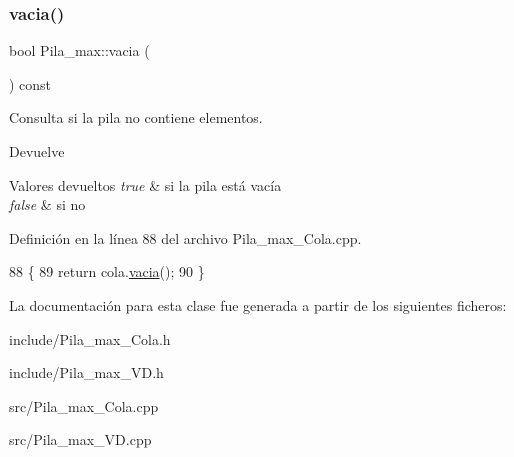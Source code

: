 \subsubsection{\texorpdfstring{vacia()}{vacia()}\hspace{0.1cm}{\footnotesize\ttfamily [2/2]}}
{\footnotesize\ttfamily bool Pila\+\_\+max\+::vacia (\begin{DoxyParamCaption}{ }\end{DoxyParamCaption}) const}



Consulta si la pila no contiene elementos. 

\begin{DoxyReturn}{Devuelve}

\end{DoxyReturn}

\begin{DoxyRetVals}{Valores devueltos}
{\em true} & si la pila está vacía \\
\hline
{\em false} & si no \\
\hline
\end{DoxyRetVals}


Definición en la línea 88 del archivo Pila\+\_\+max\+\_\+\+Cola.\+cpp.


\begin{DoxyCode}
88                           \{
89     \textcolor{keywordflow}{return} cola.\hyperlink{classCola_a2c746a66289cd4f90d4e43f712b72fb6}{vacia}();
90 \}
\end{DoxyCode}


La documentación para esta clase fue generada a partir de los siguientes ficheros\+:\begin{DoxyCompactItemize}
\item 
include/Pila\+\_\+max\+\_\+\+Cola.\+h\item 
include/Pila\+\_\+max\+\_\+\+V\+D.\+h\item 
src/Pila\+\_\+max\+\_\+\+Cola.\+cpp\item 
src/Pila\+\_\+max\+\_\+\+V\+D.\+cpp\end{DoxyCompactItemize}
